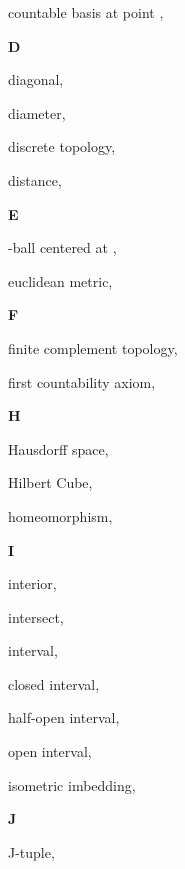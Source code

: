 \begin{multicols}{2}
countable basis at point , \pageref{def:CountableBasisAtPointX}

\vspace{1em}\noindent\large{\textbf{D}}

diagonal, \pageref{def:Diagonal}

diameter, \pageref{def:Diameter}

discrete topology, \pageref{def:DiscreteTopology}

distance, \pageref{def:Distance}

\vspace{1em}\noindent\large{\textbf{E}}

\mt{\epsilon}-ball centered at , \pageref{def:EpsilonBallCenteredAtX}

euclidean metric, \pageref{def:EuclideanMetric}

\vspace{1em}\noindent\large{\textbf{F}}

finite complement topology, \pageref{def:FiniteComplementTopology}

first countability axiom, \pageref{def:FirstCountabilityAxiom}

\vspace{1em}\noindent\large{\textbf{H}}

Hausdorff space, \pageref{def:HausdorffSpace}

Hilbert Cube, \pageref{def:HilbertCube}

homeomorphism, \pageref{def:Homeomorphism}

\vspace{1em}\noindent\large{\textbf{I}}

interior, \pageref{def:Interior}

intersect, \pageref{def:Intersect}

interval, \pageref{def:Interval}

\hspace{1em}closed interval, \pageref{def:Interval}

\hspace{1em}half-open interval, \pageref{def:Interval}

\hspace{1em}open interval, \pageref{def:Interval}

isometric imbedding, \pageref{def:IsometricImbedding}

\vspace{1em}\noindent\large{\textbf{J}}

J-tuple, \pageref{def:JTuple}


\end{multicols}
